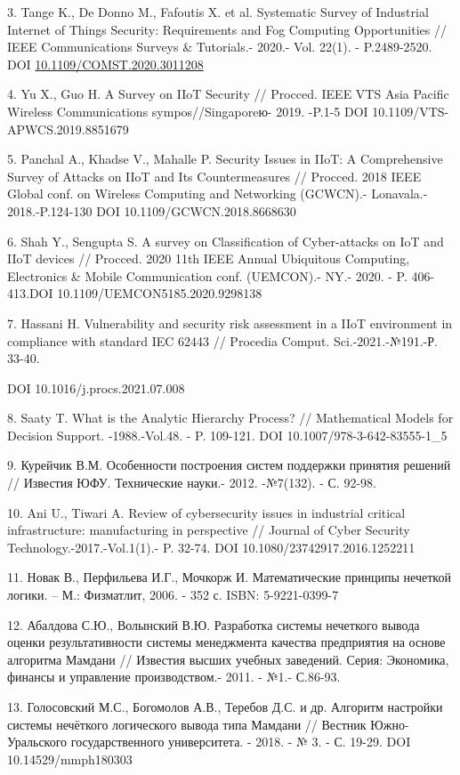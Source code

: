 3. Tange K., De Donno M., Fafoutis X. et al. Systematic Survey of
Industrial Internet of Things Security: Requirements and Fog Computing
Opportunities // IEEE Communications Surveys \& Tutorials.- 2020.- Vol.
22(1). - P.2489-2520. DOI
\href{http://dx.doi.org/10.1109/COMST.2020.3011208}{10.1109/COMST.2020.3011208}

4. Yu X., Guo H. A Survey on IIoT Security // Procced. IEEE VTS Asia
Pacific Wireless Communications sympos//Singaporeю- 2019. -P.1-5 DOI
10.1109/VTS-APWCS.2019.8851679

5. Panchal A., Khadse V., Mahalle P. Security Issues in IIoT: A
Comprehensive Survey of Attacks on IIoT and Its Countermeasures //
Procced. 2018 IEEE Global conf. on Wireless Computing and Networking
(GCWCN).- Lonavala.- 2018.-P.124-130 DOI 10.1109/GCWCN.2018.8668630

6. Shah Y., Sengupta S. A survey on Classification of Cyber-attacks on
IoT and IIoT devices // Procced. 2020 11th IEEE Annual Ubiquitous
Computing, Electronics \& Mobile Communication conf. (UEMCON).- NY.-
2020. - P. 406-413.DOI 10.1109/UEMCON5185.2020.9298138

7. Hassani H. Vulnerability and security risk assessment in a IIoT
environment in compliance with standard IEC 62443 // Procedia Comput.
Sci.-2021.-№191.-Р. 33-40.

DOI 10.1016/j.procs.2021.07.008

8. Saaty T. What is the Analytic Hierarchy Process? // Mathematical
Models for Decision Support. -1988.-Vol.48. - P. 109-121. DOI
10.1007/978-3-642-83555-1\_5

9. Курейчик В.М. Особенности построения систем поддержки принятия
решений // Известия ЮФУ. Технические науки.- 2012. -№7(132). - С. 92-98.

10. Ani U., Tiwari A. Review of cybersecurity issues in industrial
critical infrastructure: manufacturing in perspective // Journal of
Cyber Security Technology.-2017.-Vol.1(1).- P. 32-74. DOI
10.1080/23742917.2016.1252211

11. Новак В., Перфильева И.Г., Мочкорж И. Математические принципы
нечеткой логики. -- М.: Физматлит, 2006. - 352 с. ISBN: 5-9221-0399-7

12. Абалдова С.Ю., Волынский В.Ю. Разработка системы нечеткого вывода
оценки результативности системы менеджмента качества предприятия на
основе алгоритма Мамдани // Известия высших учебных заведений. Серия:
Экономика, финансы и управление производством.- 2011. - №1.- С.86-93.

13. Голосовский М.С., Богомолов А.В., Теребов Д.С. и др. Алгоритм
настройки системы нечёткого логического вывода типа Мамдани // Вестник
Южно-Уральского государственного университета. - 2018. - № 3. - С.
19-29. DOI 10.14529/mmph180303

